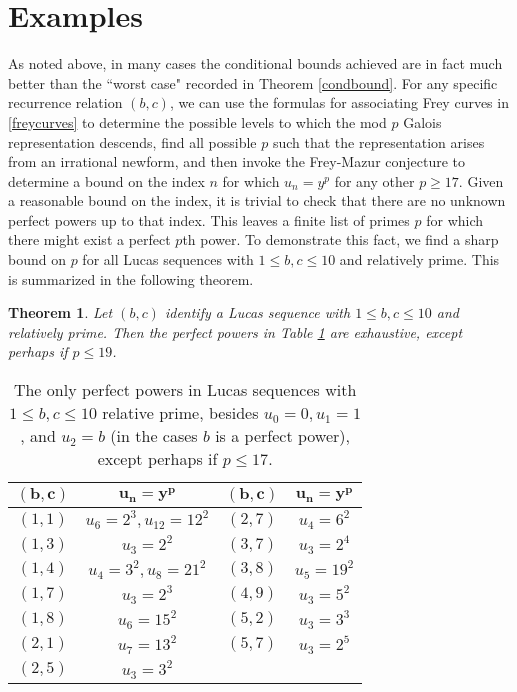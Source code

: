 \documentclass[12pt]{amsart}
\newtheorem{thm}{Theorem}[section]
\theoremstyle{definition}
\begin{document}
\section{Examples}\label{examples}

As noted above, in many cases the conditional bounds achieved are in fact much better than the ``worst case" recorded in Theorem \ref{condbound}.  For any specific recurrence relation $(b,c)$, we can use the formulas for associating Frey curves in \ref{freycurves} to determine the possible levels to which the mod $p$ Galois representation descends, find all possible $p$ such that the representation arises from an irrational newform, and then invoke the Frey-Mazur conjecture to determine a bound on the index $n$ for which $u_n=y^p$ for any other $p \geq 17$.  Given a reasonable bound on the index, it is trivial to check that there are no unknown perfect powers up to that index.  This leaves a finite list of primes $p$ for which there might exist a perfect $p$th power.  To demonstrate this fact, we find a sharp bound on $p$ for all Lucas sequences with $1 \leq b,c \leq 10$ and relatively prime.  This is summarized in the following theorem.

\begin{thm}
Let $(b,c)$ identify a Lucas sequence with $1 \leq b,c \leq 10$ and relatively prime.  Then the perfect powers in Table \ref{tab:perfectpowers} are exhaustive, except perhaps if $p \leq 19$.
\end{thm}


\begin{table}
\begin{tabular}{c | c || c | c}
$\mathbf{(b,c)}$ & $\mathbf{u_n=y^p}$ & $\mathbf{(b,c)}$ & $\mathbf{u_n = y^p}$ \\ \hline
$(1,1)$ & $u_6 = 2^3, u_{12} = 12^2$ & $(2,7)$ & $u_4 = 6^2$ \\
$(1,3)$ & $u_3 = 2^2$ & $(3,7)$ & $u_3 = 2^4$ \\
$(1,4)$ & $u_4 = 3^2, u_8 = 21^2$ & $(3,8)$ & $u_5 = 19^2$ \\
$(1,7)$ & $u_3 = 2^3$ & $(4,9)$ & $u_3 = 5^2$ \\
$(1,8)$ & $u_6 = 15^2$ & $(5,2)$ & $u_3 = 3^3$ \\
$(2,1)$ &  $u_7 = 13^2$ & $(5,7)$ & $u_3 = 2^5$ \\
$(2,5)$ & $u_3 = 3^2$ \\
\end{tabular}
\caption{The only perfect powers in Lucas sequences with $1 \leq b,c \leq 10$ relative prime, besides $u_0=0,u_1=1$, and $u_2 = b$ (in the cases $b$ is a perfect power), except perhaps if $p \leq 17$.}
\label{tab:perfectpowers}
\end{table}
\end{document}

